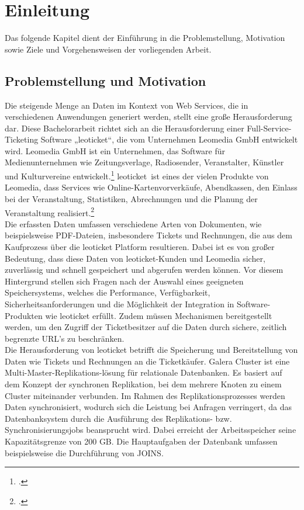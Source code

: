 \chapter{Einleitung}

Das folgende Kapitel dient der Einführung in die Problemstellung, Motivation sowie Ziele und Vorgehensweisen der vorliegenden Arbeit.

\section{Problemstellung und Motivation}

Die steigende Menge an Daten im Kontext von Web Services, die in verschiedenen Anwendungen generiert werden, stellt eine große Herausforderung dar. Diese Bachelorarbeit richtet sich an die Herausforderung einer Full-Service-Ticketing Software „leoticket“, die vom Unternehmen Leomedia GmbH entwickelt wird. 
Leomedia GmbH ist ein Unternehmen, das Software für Medienunternehmen wie Zeitungsverlage, Radiosender, Veranstalter, Künstler und Kulturvereine entwickelt.\footcite{leomedia-web}
\glqq leoticket\grqq\ ist eines der vielen Produkte von Leomedia, dass Services wie Online-Kartenvorverkäufe, Abendkassen, den Einlass bei der Veranstaltung, Statistiken, Abrechnungen und die Planung der Veranstaltung realisiert.\footcite{leomedia-web}\\ 

Die erfassten Daten umfassen verschiedene Arten von Dokumenten, wie beispielsweise PDF-Dateien, insbesondere Tickets und Rechnungen, die aus dem Kaufprozess über die leoticket Platform resultieren. Dabei ist es von großer Bedeutung, dass diese Daten von leoticket-Kunden und Leomedia sicher, zuverlässig und schnell gespeichert und abgerufen werden können. Vor diesem Hintergrund stellen sich Fragen nach der Auswahl eines geeigneten Speichersystems, welches die Performance, Verfügbarkeit, Sicherheitsanforderungen und die Möglichkeit der Integration in Software-Produkten wie leoticket erfüllt. Zudem müssen Mechanismen bereitgestellt werden, um den Zugriff der Ticketbesitzer auf die Daten durch sichere, zeitlich begrenzte URL’s zu beschränken.\\

Die Herausforderung von leoticket betrifft die Speicherung und Bereitstellung von Daten wie Tickets und Rechnungen an die Ticketkäufer. Galera Cluster ist eine Multi-Master-Replikations-lösung für relationale Datenbanken. Es basiert auf dem Konzept der synchronen Replikation, bei dem mehrere Knoten zu einem Cluster miteinander verbunden. Im Rahmen des Replikationsprozesses werden Daten synchronisiert, wodurch sich die Leistung bei Anfragen verringert, da das Datenbanksystem durch die Ausführung des Replikations- bzw. Synchronisierungsjobs beansprucht wird. Dabei erreicht der Arbeitsspeicher seine Kapazitätsgrenze von 200 GB. Die Hauptaufgaben der Datenbank umfassen beispielsweise die Durchführung von JOINS.\\ 

